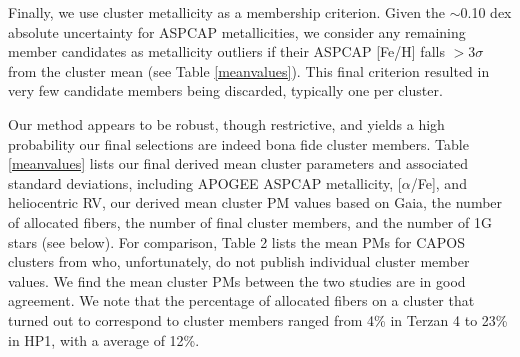 \documentclass[onecolumn]{aa}
\begin{document}
Finally, we use cluster metallicity as a membership criterion. Given the $\sim$0.10 dex absolute uncertainty for ASPCAP metallicities,
we consider any remaining member candidates as metallicity outliers if their ASPCAP [Fe/H] falls  $>3\sigma$ from
the cluster mean (see Table \ref{meanvalues}). This final criterion resulted in very few candidate members being
discarded, typically one per cluster.

Our method appears to be robust, though restrictive, and yields a high probability our final selections are indeed bona fide cluster members. 
Table \ref{meanvalues} lists our final derived mean cluster parameters and associated standard deviations,
including APOGEE ASPCAP metallicity, [$\alpha$/Fe], and heliocentric RV, our derived mean cluster PM values based on Gaia, {the number of allocated fibers},
the number of final cluster members, and the number of 1G stars (see below). For comparison, Table 2 lists the mean PMs
for CAPOS clusters from \citet{Baumgardt2019} who, unfortunately, do not publish individual cluster member values.
We find the mean cluster PMs between the two studies are in good agreement. We note that the percentage of allocated fibers on a cluster that turned out to correspond to cluster members ranged from 4\% in Terzan 4 to 23\% in HP1, with a average of 12\%.
\end{document}
